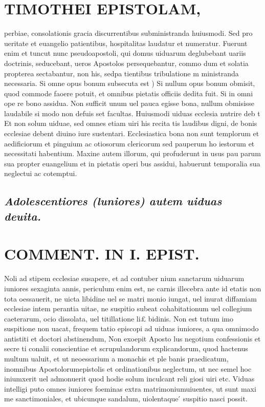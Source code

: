 \documentclass{article}
\begin{document}
\begin{pages}
\section*{TIMOTHEI EPISTOLAM, }
\marginpar{[ p.129 ]}\pstart perbiae, consolationis gracia discurrentibus subministranda huiusmodi. Sed pro ueritate et euangelio patientibus, hospitalitas laudatur et numeratur. Fuerunt enim et tuncut nunc pseudoapostoli, qui domus uiduarum deglubebant uariis doctrinis, seducebant, ueros Apostolos persequebantur, commo dum et solatia propterea sectabantur, non his, sedpa tientibus tribulatione m ministranda necessaria.  \pend\pstart Si omne opus bonum subsecuta est ) Si nullum opus bonum obmisit, quod commode faoere potuit, et omnibus pietatis officiis dedita fuit. Si in omni ope re bono assidua. Non sufficit unum uel pauca egisse bona, nullum obmisisse laudabile si modo non defuis set facultas. Huiusmodi uiduas ecclesia nutrire deb t Et non solum uiduae, sed omnes etiam uiri his recita tis laudibus digni, de bonis ecclesiae debent diuino iure sustentari. Ecclesiastica bona non sunt templorum et aedificiorum et pinguium ac otiosorum clericorum sed pauperum ho iestorum et necessitati habentium. Maxine autem illorum, qui profuderunt in usus pau parum sua propter euangelium et in pietatis operi bus assidui, habuerunt temporalia sua neglectui ac cotemptui.  \pend
{}
{}
\subsection*{\textit{Adolescentiores (luniores) autem uiduas deuita. }}
\section*{COMMENT. IN I. EPIST. }
\marginpar{[ p.130 ]}\pstart Noli ad stipem ecclesiae susapere, et ad contuber nium sanctarum uiduarum iuniores sexaginta annis, periculum enim est, ne carnis illecebra ante id etatis non tota oessauerit, ne uicta libidine uel se matri monio iungat, uel inurat diffamiam ecclesiae intem perantia uitae, ne suspitio subeat cohabitationum uel collegium caeterarum, ocio dissolata, uel titillatione li£ bidinis. Non est tutum imo suspitione non uacat, frequem tatio episcopi ad uiduas iuniores, a qua omnimodo antistiti et doctori abstinendum, Non exoepit Aposto lus negotium confessionis et secre ti conalii conscientiae et scrupulandorum explicandorum, quod hactenus multum ualuit, et ut neoessarium a monachis et ple banis praedicatum, inomnibus Apostolorumepistolis et ordinationibus neglectum, ut nec semel hoc iniumxerit uel admonuerit quod hodie solum inculcant reli giosi uiri etc. Viduas intelligi puto omnes iuniores foeminas extra matrimoniumuiuentes, ut sunt maxi me sanctimoniales, et ubicunque sandalum, uiolentaque ́ suspitio nasci possit.  \pend
{}
{}

\end{pages}
\end{document}
